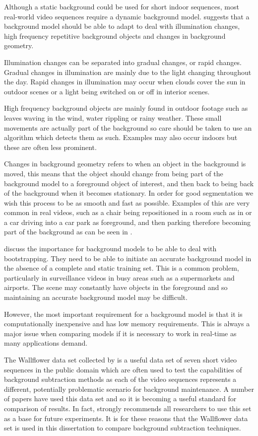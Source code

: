 Although a static background could be used for short indoor sequences, most real-world video sequences require a dynamic background model. \cite{piccardi2004background} suggests that a background model should be able to adapt to deal with illumination changes, high frequency repetitive background objects and changes in background geometry. 

Illumination changes can be separated into gradual changes, or rapid changes. Gradual changes in illumination are mainly due to the light changing throughout the day. Rapid changes in illumination may occur when clouds cover the sun in outdoor scenes or a light being switched on or off in interior scenes.

High frequency background objects are mainly found in outdoor footage such as leaves waving in the wind, water rippling or rainy weather. These small movements are actually part of the background so care should be taken to use an algorithm which detects them as such. Examples may also occur indoors but these are often less prominent.

Changes in background geometry refers to when an object in the background is moved, this means that the object should change from being part of the background model to a foreground object of interest, and then back to being back of the background when it becomes stationary. In order for good segmentation we wish this process to be as smooth and fast as possible. Examples of this are very common in real videos, such as a chair being repositioned in a room such as in \cite{toyama1999wallflower} or a car driving into a car park as foreground, and then parking therefore becoming part of the background as can be seen in \cite{pets2001}.

\cite{barnich2011vibe} discuss the importance for background models to be able to deal with bootstrapping. They need to be able to initiate an accurate background model in the absence of a complete and static training set. This is a common problem, particularly in surveillance videos in busy areas such as a supermarkets and airports. The scene may constantly have objects in the foreground and so maintaining an accurate background model may be difficult. 

However, the most important requirement for a background model is that it is computationally inexpensive and has low memory requirements. This is always a major issue when comparing models if it is necessary to work in real-time as many applications demand.

 The Wallflower data set collected by \cite{toyama1999wallflower} is a useful data set of seven short video sequences in the public domain which are often used to test the capabilities of background subtraction methods as each of the video sequences represents a different, potentially problematic scenario for background maintenance. A number of papers have used this data set and so it is becoming a useful standard for comparison of results. In fact, \cite{bouwmans2011recent} strongly recommends all researchers to use this set as a base for future experiments. It is for these reasons that the Wallflower data set is used in this dissertation to compare background subtraction techniques. 

